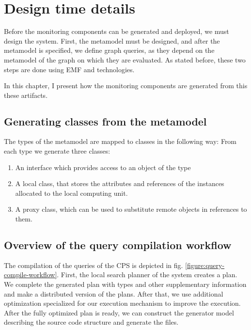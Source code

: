 \chapter{Design time details}

Before the monitoring components can be generated and deployed, we must design the system. First, the metamodel must be designed, and after the metamodel is specified, we define graph queries, as they depend on the metamodel of the graph on which they are evaluated. As stated before, these two steps are done using EMF and \viatra{} technologies.

In this chapter, I present how the monitoring components are generated from this these artifacts. 

\section{Generating classes from the metamodel}

The types of the metamodel are mapped to \cpp{} classes in the following way: From each type we generate three \cpp{} classes:

\begin{enumerate}
	\item An interface which provides access to an object of the type
	\item A local class, that stores the attributes and references of the instances allocated to the local computing unit.
	\item A proxy class, which can be used to substitute remote objects in references to them.
\end{enumerate}


\section{Overview of the query compilation workflow}

The compilation of the queries of the CPS is depicted in fig. \ref{figure:query-compile-workflow}. First, the local search planner of the \viatra{} system creates a plan. We complete the generated plan with types and other supplementary information and make a distributed version of the plans. After that, we use additional optimization specialized for our execution mechanism to improve the execution. After the fully optimized plan is ready, we can construct the generator model describing the source code structure and generate the \cpp{} files.

